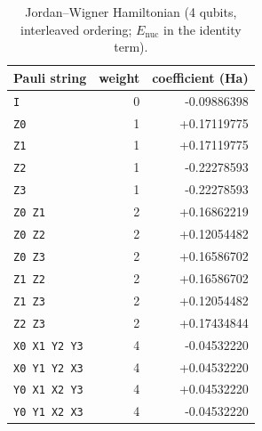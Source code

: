 \begin{table}[H]
\centering\small
\begin{tabular}{lrr}
\toprule
Pauli string & weight & coefficient (Ha) \\
\midrule
\texttt{I} & 0 & -0.09886398 \\
\texttt{Z0} & 1 & +0.17119775 \\
\texttt{Z1} & 1 & +0.17119775 \\
\texttt{Z2} & 1 & -0.22278593 \\
\texttt{Z3} & 1 & -0.22278593 \\
\texttt{Z0\,Z1} & 2 & +0.16862219 \\
\texttt{Z0\,Z2} & 2 & +0.12054482 \\
\texttt{Z0\,Z3} & 2 & +0.16586702 \\
\texttt{Z1\,Z2} & 2 & +0.16586702 \\
\texttt{Z1\,Z3} & 2 & +0.12054482 \\
\texttt{Z2\,Z3} & 2 & +0.17434844 \\
\texttt{X0\,X1\,Y2\,Y3} & 4 & -0.04532220 \\
\texttt{X0\,Y1\,Y2\,X3} & 4 & +0.04532220 \\
\texttt{Y0\,X1\,X2\,Y3} & 4 & +0.04532220 \\
\texttt{Y0\,Y1\,X2\,X3} & 4 & -0.04532220 \\
\bottomrule
\end{tabular}
\caption{Jordan--Wigner Hamiltonian (4 qubits, interleaved ordering; $E_\mathrm{nuc}$ in the identity term).}
\end{table}
